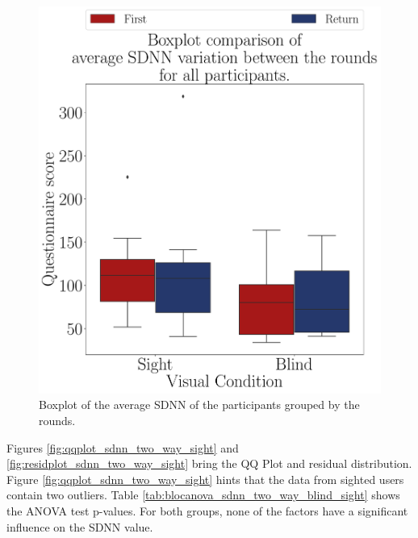 \begin{figure}[!htb]
\begin{minipage}{0.45\textwidth}
        \centering
        \includegraphics[width = \textwidth]{Resultados/ECG/Figuras/pdf/boxplot_ecg_sdnn_4_rounds.pdf}
        \caption{Boxplot of the average SDNN of the participants grouped by the rounds.}
        \label{fig:boxplot_ecg_sdnn_4_rounds}
    \end{minipage}
\end{figure}
 
%
%

Figures \ref{fig:qqplot_sdnn_two_way_sight} and \ref{fig:residplot_sdnn_two_way_sight} bring the QQ Plot and residual distribution. Figure \ref{fig:qqplot_sdnn_two_way_sight} hints that the data from sighted users contain two outliers. Table \ref{tab:blocanova_sdnn_two_way_blind_sight} shows the ANOVA test p-values. For both groups, none of the factors have a significant influence on the SDNN value.

